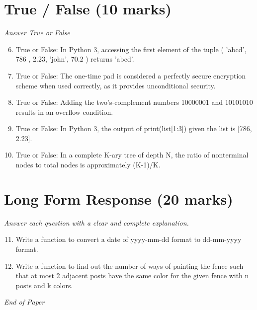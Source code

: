 \documentclass[12pt]{article}
\begin{document}
\section*{True / False (10 marks)}
\textit{Answer True or False}
\begin{enumerate}[label=\arabic*.]
\setcounter{enumi}{5}
\item True or False: In Python 3, accessing the first element of the tuple ( 'abcd', 786 , 2.23, 'john', 70.2 ) returns 'abcd'.
\item True or False: The one-time pad is considered a perfectly secure encryption scheme when used correctly, as it provides unconditional security.
\item True or False: Adding the two's-complement numbers 10000001 and 10101010 results in an overflow condition.
\item True or False: In Python 3, the output of print(list[1:3]) given the list is [786, 2.23].
\item True or False: In a complete K-ary tree of depth N, the ratio of nonterminal nodes to total nodes is approximately (K-1)/K.
\end{enumerate}

\section*{Long Form Response (20 marks)}
\textit{Answer each question with a clear and complete explanation.}
\begin{enumerate}[label=\arabic*.]
\setcounter{enumi}{10}
\item Write a function to convert a date of yyyy-mm-dd format to dd-mm-yyyy format.
\item Write a function to find out the number of ways of painting the fence such that at most 2 adjacent posts have the same color for the given fence with n posts and k colors.
\end{enumerate}

\vfill
\noindent\textit{End of Paper}
\end{document}
